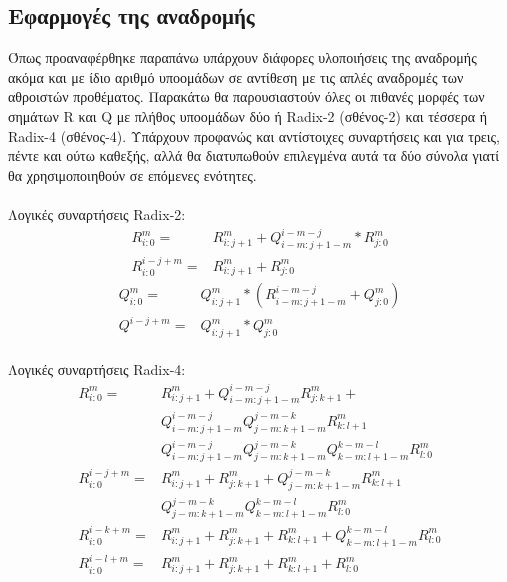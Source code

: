 \subsection{Εφαρμογές της αναδρομής}
Όπως προαναφέρθηκε παραπάνω υπάρχουν διάφορες υλοποιήσεις της αναδρομής ακόμα και με 
ίδιο αριθμό υποομάδων \cite{5470204} σε αντίθεση με τις απλές αναδρομές των αθροιστών προθέματος.
Παρακάτω θα παρουσιαστούν όλες οι πιθανές μορφές των σημάτων R και Q με πλήθος υποομάδων
δύο ή Radix-2 (σθένος-2) και τέσσερα ή Radix-4 (σθένος-4). Υπάρχουν προφανώς και αντίστοιχες συναρτήσεις και για τρεις, πέντε και ούτω καθεξής,
αλλά θα διατυπωθούν επιλεγμένα αυτά τα δύο σύνολα γιατί θα χρησιμοποιηθούν σε επόμενες ενότητες.
\\\\
Λογικές συναρτήσεις Radix-2:
\begin{equation}
    \begin{split}
        R^m_{i:0} =& R^m_{i:j+1} + Q^{i-m-j}_{i-m:j+1-m}*R^{m}_{j:0}\\
        R^{i-j+m}_{i:0} =& R^m_{i:j+1} + R^{m}_{j:0}
    \end{split}
\end{equation}
\begin{equation}
    \begin{split}
        Q^m_{i:0} =& Q^m_{i:j+1} * ( R^{i-m-j}_{i-m:j+1-m} + Q^m_{j:0} )\\
        Q^{i-j+m} =& Q^m_{i:j+1} * Q^m_{j:0}
    \end{split}
\end{equation}
\\
Λογικές συναρτήσεις Radix-4:
\begin{equation}
    \begin{split}
        R^m_{i:0} =& R^m_{i:j+1} + Q^{i-m-j}_{i-m:j+1-m}R^m_{j:k+1} +\\
                   & Q^{i-m-j}_{i-m:j+1-m}Q^{j-m-k}_{j-m:k+1-m}R^m_{k:l+1}\\
                   & Q^{i-m-j}_{i-m:j+1-m}Q^{j-m-k}_{j-m:k+1-m}Q^{k-m-l}_{k-m:l+1-m}R^m_{l:0}\\
        R^{i-j+m}_{i:0} =& R^m_{i:j+1} + R^m_{j:k+1} + Q^{j-m-k}_{j-m:k+1-m}R^m_{k:l+1}\\
                         & Q^{j-m-k}_{j-m:k+1-m}Q^{k-m-l}_{k-m:l+1-m}R^m_{l:0}\\
        R^{i-k+m}_{i:0} =& R^m_{i:j+1} + R^m_{j:k+1} + R^m_{k:l+1} + Q^{k-m-l}_{k-m:l+1-m}R^m_{l:0}\\
        R^{i-l+m}_{i:0} =& R^m_{i:j+1} + R^m_{j:k+1} + R^m_{k:l+1} + R^m_{l:0}
    \end{split}
\end{equation}

